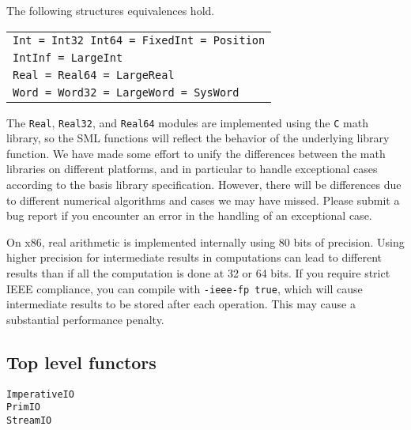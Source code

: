 

The following structures equivalences hold.\\
\begin{tabular}{l}
\tt Int = Int32
\tt Int64 = FixedInt = Position\\
\tt IntInf = LargeInt\\
\tt Real = Real64 = LargeReal\\
\tt Word = Word32 = LargeWord = SysWord
\end{tabular}

The {\tt Real}, {\tt Real32}, and {\tt Real64} modules are implemented
using the {\tt C} math library, so the SML functions will reflect the
behavior of the underlying library function.  We have made some effort
to unify the differences between the math libraries on different
platforms, and in particular to handle exceptional cases according to
the basis library specification.  However, there will be differences
due to different numerical algorithms and cases we may have missed.
Please submit a bug report if you encounter an error in the handling
of an exceptional case.

On x86, real arithmetic is implemented internally using 80 bits of
precision.  Using higher precision for intermediate results in
computations can lead to different results than if all the computation
is done at 32 or 64 bits.  If you require strict IEEE compliance, you
can compile with {\tt -ieee-fp true}, which will cause intermediate
results to be stored after each operation.  This may cause a
substantial performance penalty.
%
\subsection{Top level functors}

{\tt ImperativeIO}\\
{\tt PrimIO}\\
{\tt StreamIO}

